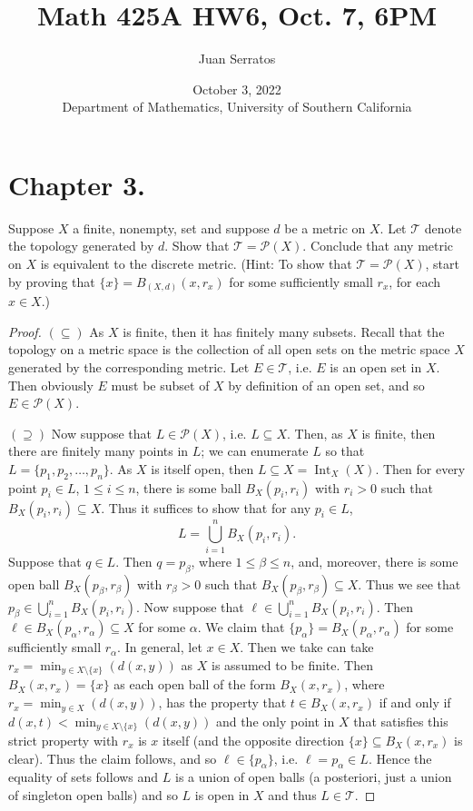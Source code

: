 \documentclass[10pt,reqno]{amsart}
\title{Math 425A HW6, Oct. 7, 6PM}
\author{Juan Serratos}
\date{October 3, 2022 \\ {Department of Mathematics, University of Southern California}}
\theoremstyle{definition}
\DeclareMathOperator{\Int}{Int}
\begin{document}
\maketitle
\setcounter{tocdepth}{4}
\setcounter{secnumdepth}{4}

\section{Chapter 3.}

\begin{tcolorbox}[colback=black!5!white,colframe=black!75!black,title= Chapter 3 $\S2.4$: Exercise 2.9.] Suppose $X$ a finite, nonempty, set and suppose $d$ be a metric on $X$. Let $\mathcal T$ denote the topology generated by $d$. Show that $\mathcal T = \mathcal P(X)$. Conclude that any metric on $X$ is equivalent to the discrete metric. (Hint: To show that $\mathcal T = \mathcal P (X)$, start by proving that $\{ x \} = B_{(X,d)} (x, r_x)$ for some sufficiently small $r_x$, for each $x \in X$.)
\tcblower 
\begin{proof}
$(\subseteq)$ As $X$ is finite, then it has finitely many subsets. Recall that the topology on a metric space is the collection of all open sets on the metric space $X$ generated by the corresponding metric. Let $E \in \mathcal T$, i.e. $E$ is an open set in $X$. Then obviously $E$ must be subset of $X$ by definition of an open set, and so $E \in \mathcal P(X)$. 

$(\supseteq)$ Now suppose that $L \in \mathcal P (X)$, i.e. $L \subseteq X$. Then, as $X$ is finite, then there are finitely many points in $L$; we can enumerate $L$ so that $L = \{p_1, p_2, \ldots, p_n \}$. As $X$ is itself open, then $L \subseteq X = \Int_X(X)$. Then for every point $p_i \in L$, $1 \leq i \leq n$, there is some ball $B_X(p_i, r_i)$ with $r_i > 0$ such that $B_X(p_i, r_i) \subseteq X$. Thus it suffices to show that for any $p_i \in L$, \[ L = \bigcup _{i = 1}^n B_X(p_i, r_i).\] Suppose that $q \in L$. Then $q = p_\beta$, where $1 \leq \beta \leq n$, and, moreover, there is some open ball $B_X(p_\beta, r_\beta )$ with $r_\beta > 0$ such that $B_X(p_\beta, r_\beta) \subseteq X$. Thus we see that $p_\beta \in \bigcup_{i =1}^n B_X(p_i, r_i)$. Now suppose that $\ell \in \bigcup_{i =1}^n B_X(p_i, r_i)$. Then $\ell \in B_X(p_\alpha, r_\alpha) \subseteq X$ for some $\alpha$. We claim that $\{p_\alpha \} = B_X(p_\alpha, r_\alpha)$ for some sufficiently small $r_\alpha$. In general, let $x \in X$. Then we take can take $r_x = \min_{y \in X\setminus \{x \}}(d(x,y))$ as $X$ is assumed to be finite. Then $B_X(x, r_x) = \{x \}$ as each open ball of the form $B_X(x, r_x)$, where $r_x = \min_{y \in X} (d(x,y))$, has the property that $t \in B_X(x, r_x)$ if and only if $d(x,t) < \min _{y \in X\setminus \{x \}} (d(x,y))$ and the only point in $X$ that satisfies this strict property with $r_x$ is $x$ itself (and the opposite direction $\{x \} \subseteq B_X(x, r_x)$ is clear). Thus the claim follows, and so $\ell \in \{p_\alpha \}$, i.e. $\ell = p_\alpha \in L$. Hence the equality of sets follows and $L$ is a union of open balls (a posteriori, just a union of singleton open balls) and so $L$ is open in $X$ and thus $L \in \mathcal T$. 


\end{proof}
\end{tcolorbox}
\end{document}
